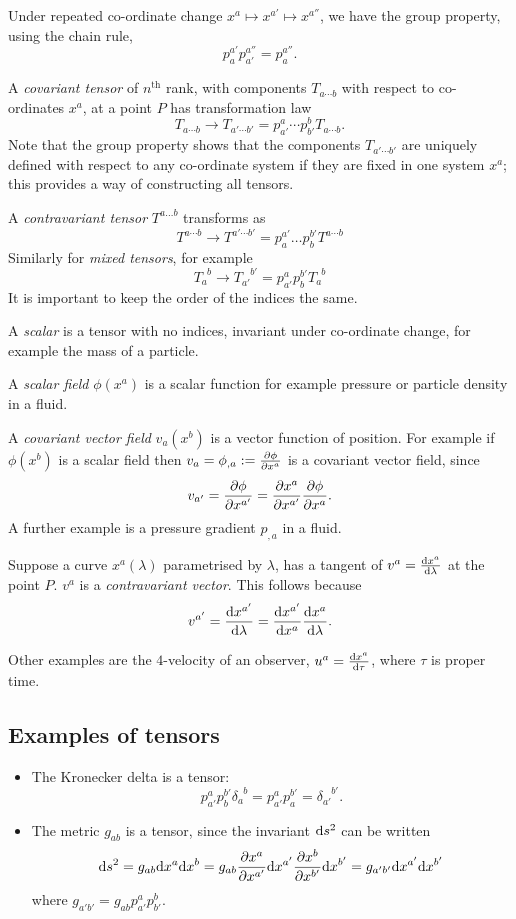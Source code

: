 \documentclass{notes}
\begin{document}
Under repeated co-ordinate change $x^a \mapsto x^{a'} \mapsto x^{a''}$, 
we have the group property, using the chain rule,
\[
p^{a'}_a p^{a''}_{a'} = p^{a''}_a.
\]

A \emph{covariant tensor} of $n^{\text{th}}$ rank, with components $T_{a
  \cdots b}$ with respect to co-ordinates $x^a$, at a point $P$
has transformation law
\[
T_{a \cdots b} \to T_{a' \cdots b'}=p^{a}_{a'} \cdots
p^{b}_{b'} T_{a \cdots b}.
\]
Note that the group property shows that the components $T_{a' \cdots b'}$
are uniquely defined with respect to any co-ordinate system if they are
fixed in one system $x^a$; this provides a way of constructing all tensors.

A \emph{contravariant tensor} $T^{a \dots b}$ transforms as
\[
T^{a \cdots b} \to T^{a' \cdots b'}= p^{a'}_{a}
\dots p^{b'}_{b}  T^{a \cdots b}
\]
Similarly for \emph{mixed tensors}, for example
\[
T^{\phantom{a}b}_a \to T^{\phantom{a'}b'}_{a'} 
= p^a_{a'} p^{b'}_b T^{\phantom{a}b}_a
\]
It is important to keep the order of the indices the same.

A \emph{scalar} is a tensor with no indices, invariant under 
co-ordinate change, for example the mass of a particle.

A \emph{scalar field} $\phi(x^a)$ is a scalar function for example
pressure or particle density in a fluid.

A \emph{covariant vector field} $v_a(x^b)$ is a vector function
of position.  For example if $\phi (x^b)$ is a scalar field then
$v_a = \phi_{,a}:=\frac{\partial \phi}{\partial x^a}$
is a covariant vector field, since 
\[
v_{a'}= \frac{\partial \phi}{\partial x^{a'}} = \frac{\partial x^a}{\partial x^{a'}} \frac{\partial \phi}{\partial x^a}.
\]
A further example is a pressure gradient $p_{,a}$ in a fluid.

Suppose a curve $x^a(\lambda)$
parametrised by $\lambda$, has a tangent of $v^a=\frac{\mathrm{d} x^a}{\mathrm{d}\lambda}$
at the point $P$.  $v^a$ is a \emph{contravariant vector}.  This follows
because
\[
v^{a'}= \frac{\mathrm{d} x^{a'}}{\mathrm{d}\lambda} =
\frac{\mathrm{d} x^{a'}}{\mathrm{d} x^a}\frac{\mathrm{d} x^a}{\mathrm{d}\lambda}.
\]

Other examples are the $4$-velocity of an observer, $u^a=\frac{\mathrm{d} x^a}{\mathrm{d}\tau}$,
where $\tau$ is proper time.

\subsection{Examples of tensors}

\begin{itemize}
\item The Kronecker delta is a tensor:
\[
p^a_{a'} p^{b'}_{b} \delta^{\phantom{a}b}_a = 
p^a_{a'} p^{b'}_a = \delta^{\phantom{a'}b'}_{a'}.
\]
\item The metric $g_{ab}$ is a tensor, since the invariant $\mathrm{d} s^2$
can be written
\[
\mathrm{d} s^2= g_{ab} \mathrm{d} x^a \mathrm{d} x^b = g_{ab}
\frac{\partial x^a}{\partial x^{a'}} \mathrm{d} x^{a'} \frac{\partial x^b}{\partial x^{b'}} \mathrm{d} x^{b'} =
g_{a'b'} \mathrm{d} x^{a'} \mathrm{d} x^{b'}
\]
where $g_{a'b'}=g_{ab} p^a_{a'} p^b_{b'}$.
\end{itemize}
\end{document}
